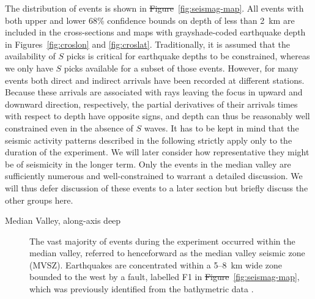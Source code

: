 \documentclass[jgrga]{agu2001} %
\providecommand{\DIFadd}[1]{{\protect\color{blue}\uwave{#1}}} %
\providecommand{\DIFdel}[1]{{\protect\color{red}\sout{#1}}}                      %
\providecommand{\DIFaddbegin}{} %
\providecommand{\DIFaddend}{} %
\providecommand{\DIFdelbegin}{} %
\providecommand{\DIFdelend}{} %
\begin{document}
\begin{article}
The distribution of events is shown in
\DIFdelbegin \DIFdel{Figure}\DIFdelend \DIFaddbegin \DIFadd{Plate}\DIFaddend ~\ref{fig:seismag-map}. All events with both upper
and lower 68\% confidence bounds on depth of less than 2~km are
included in the cross-sections and maps with grayshade-coded earthquake
depth in Figures~\ref{fig:croslon} and \ref{fig:croslat}.
Traditionally, it is assumed that the availability of $S$ picks is
critical for earthquake depths to be constrained, whereas we only have
$S$ picks available for a subset of those events.  However, for many
events both direct and indirect arrivals have been recorded at
different stations.  Because these arrivals are associated with rays leaving
the focus in upward and downward direction, respectively, the
partial derivatives of their arrivals times with respect to depth have
opposite signs, and depth can thus be reasonably well constrained even
in the absence of $S$ waves.
It has to be kept in mind that the seismic activity patterns described
in the following strictly apply only to the duration of the
experiment. We will later consider how representative they might be of
seismicity in the longer term.  Only the events in the median valley
are sufficiently numerous and well-constrained to warrant a detailed
discussion.  We will thus defer discussion of these events to a later
section but briefly discuss the other groups here.
\begin{description}
\item[Median Valley, along-axis deep]  The vast majority of events during the
experiment occurred within the median valley, referred to henceforward
as the median valley seismic zone (MVSZ).  Earthquakes are
concentrated within a 5--8~km wide zone bounded to the west by a
fault, labelled F1 in \DIFdelbegin \DIFdel{Figure}\DIFdelend \DIFaddbegin \DIFadd{Plate}\DIFaddend ~\ref{fig:seismag-map}, which was
previously identified from the bathymetric data \citep{reston02}.


\end{description}
\end{article}
\end{document}
